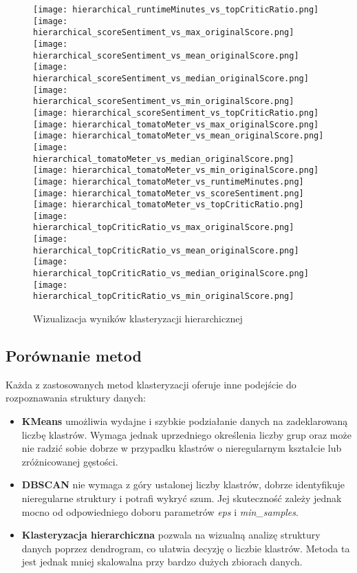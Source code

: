 \documentclass[a4paper,12pt,titlepage]{article}
\begin{document}
\begin{figure}[H]
\texttt{[image: hierarchical\_runtimeMinutes\_vs\_topCriticRatio.png]}
\texttt{[image: hierarchical\_scoreSentiment\_vs\_max\_originalScore.png]}
\texttt{[image: hierarchical\_scoreSentiment\_vs\_mean\_originalScore.png]}
\texttt{[image: hierarchical\_scoreSentiment\_vs\_median\_originalScore.png]}
\texttt{[image: hierarchical\_scoreSentiment\_vs\_min\_originalScore.png]}
\texttt{[image: hierarchical\_scoreSentiment\_vs\_topCriticRatio.png]}
\texttt{[image: hierarchical\_tomatoMeter\_vs\_max\_originalScore.png]}
\texttt{[image: hierarchical\_tomatoMeter\_vs\_mean\_originalScore.png]}
\texttt{[image: hierarchical\_tomatoMeter\_vs\_median\_originalScore.png]}
\texttt{[image: hierarchical\_tomatoMeter\_vs\_min\_originalScore.png]}
\texttt{[image: hierarchical\_tomatoMeter\_vs\_runtimeMinutes.png]}
\texttt{[image: hierarchical\_tomatoMeter\_vs\_scoreSentiment.png]}
\texttt{[image: hierarchical\_tomatoMeter\_vs\_topCriticRatio.png]}
\texttt{[image: hierarchical\_topCriticRatio\_vs\_max\_originalScore.png]}
\texttt{[image: hierarchical\_topCriticRatio\_vs\_mean\_originalScore.png]}
\texttt{[image: hierarchical\_topCriticRatio\_vs\_median\_originalScore.png]}
\texttt{[image: hierarchical\_topCriticRatio\_vs\_min\_originalScore.png]}
\caption{Wizualizacja wyników klasteryzacji hierarchicznej}
\end{figure}

\subsection{Porównanie metod}

Każda z zastosowanych metod klasteryzacji oferuje inne podejście do rozpoznawania struktury danych:

\begin{itemize}
    \item \textbf{KMeans} umożliwia wydajne i szybkie podziałanie danych na zadeklarowaną liczbę klastrów. Wymaga jednak uprzedniego określenia liczby grup oraz może nie radzić sobie dobrze w przypadku klastrów o nieregularnym kształcie lub zróżnicowanej gęstości.
    \item \textbf{DBSCAN} nie wymaga z góry ustalonej liczby klastrów, dobrze identyfikuje nieregularne struktury i potrafi wykryć szum. Jej skuteczność zależy jednak mocno od odpowiedniego doboru parametrów \textit{eps} i \textit{min\_samples}.
    \item \textbf{Klasteryzacja hierarchiczna} pozwala na wizualną analizę struktury danych poprzez dendrogram, co ułatwia decyzję o liczbie klastrów. Metoda ta jest jednak mniej skalowalna przy bardzo dużych zbiorach danych.
\end{itemize}
\end{document}
